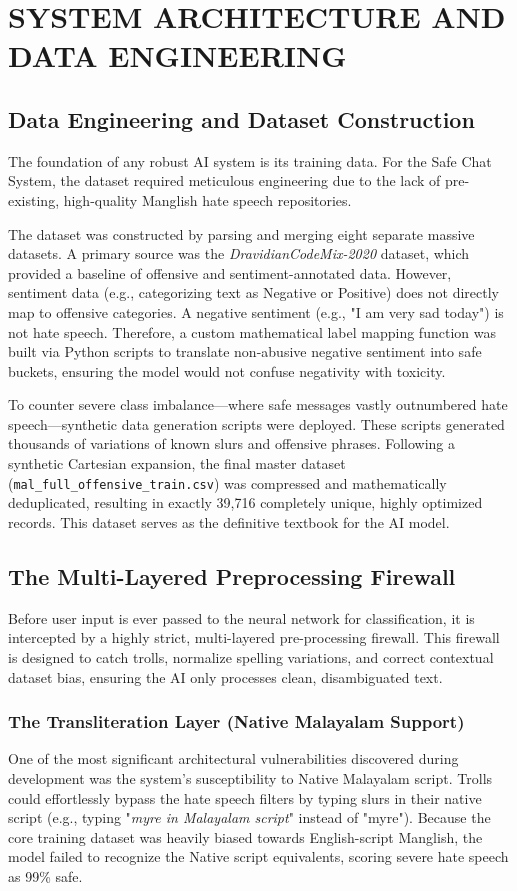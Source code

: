 \documentclass[12pt,a4paper]{report}
\newcommand{\malayalamexample}{\textit{myre in Malayalam script}}
\newcommand{\malayalamexample}{{\malayalamfont മൈര്}}
\begin{document}
\chapter{SYSTEM ARCHITECTURE AND DATA ENGINEERING}

\section{Data Engineering and Dataset Construction}
The foundation of any robust AI system is its training data. For the Safe Chat System, the dataset required meticulous engineering due to the lack of pre-existing, high-quality Manglish hate speech repositories. 

The dataset was constructed by parsing and merging eight separate massive datasets. A primary source was the \textit{DravidianCodeMix-2020} dataset, which provided a baseline of offensive and sentiment-annotated data. However, sentiment data (e.g., categorizing text as Negative or Positive) does not directly map to offensive categories. A negative sentiment (e.g., "I am very sad today") is not hate speech. Therefore, a custom mathematical label mapping function was built via Python scripts to translate non-abusive negative sentiment into safe buckets, ensuring the model would not confuse negativity with toxicity.

To counter severe class imbalance—where safe messages vastly outnumbered hate speech—synthetic data generation scripts were deployed. These scripts generated thousands of variations of known slurs and offensive phrases. Following a synthetic Cartesian expansion, the final master dataset (\texttt{mal\_full\_offensive\_train.csv}) was compressed and mathematically deduplicated, resulting in exactly 39,716 completely unique, highly optimized records. This dataset serves as the definitive textbook for the AI model.

\section{The Multi-Layered Preprocessing Firewall}
Before user input is ever passed to the neural network for classification, it is intercepted by a highly strict, multi-layered pre-processing firewall. This firewall is designed to catch trolls, normalize spelling variations, and correct contextual dataset bias, ensuring the AI only processes clean, disambiguated text.

\subsection{The Transliteration Layer (Native Malayalam Support)}
One of the most significant architectural vulnerabilities discovered during development was the system's susceptibility to Native Malayalam script. Trolls could effortlessly bypass the hate speech filters by typing slurs in their native script (e.g., typing "\malayalamexample{}" instead of "myre"). Because the core training dataset was heavily biased towards English-script Manglish, the model failed to recognize the Native script equivalents, scoring severe hate speech as 99\% safe.
\end{document}
